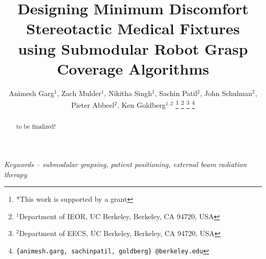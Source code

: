 \documentclass[letterpaper, 10 pt, conference]{ieeeconf}  %
\title{\LARGE \bf
Designing Minimum Discomfort Stereotactic Medical Fixtures \\
using Submodular Robot Grasp Coverage Algorithms 
}
\author{Animesh Garg$^{1}$, Zach Mulder$^{1}$, Nikitha Singh$^{1}$, Sachin Patil$^{2}$, John Schulman$^{2}$, Pieter Abbeel$^{2}$, Ken Goldberg$^{1,2}$%
\thanks{*This work is supported by a grant}%
\thanks{$^{1}$Department of IEOR, UC Berkeley,
	Berkeley, CA 94720, USA}%
\thanks{$^{2}$Department of EECS, UC Berkeley,
        Berkeley, CA 94720, USA}%
\thanks{{\tt\small \{animesh.garg, sachinpatil, goldberg\} @berkeley.edu}}%
}
\begin{document}
\maketitle
\thispagestyle{empty}
\pagestyle{empty}


\begin{abstract}
to be finalized!
\end{abstract}

\noindent \textit{ Keywords -- submodular grapsing, patient positioning, 
external beam radiation therapy}










\addtolength{\textheight}{-12cm}  

%
%

%

\end{document}
